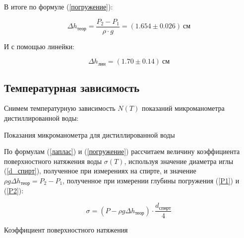 \documentclass[a4paper,12pt]{article} %
\begin{document}
В итоге по формуле (\ref{погружение}):

\begin{equation}\label{h_теор}
	\Delta h_{теор} = \dfrac{P_2 - P_1}{\rho \cdot g} = (1.654 \pm 0.026) \ см
\end{equation}

И с помощью линейки:

\begin{equation}\label{h_лин}
	\Delta h_{лин} = (1.70 \pm 0.14) \ см
\end{equation}

\subsection*{Температурная зависимость}

Снимем температурную зависимость $N(T)$ показаний микроманометра дистиллированной воды:

\begin{table}[ht!]
	\centering
	
	\caption{Показания микроманометра для дистиллированной воды}
\end{table}

По формулам (\ref{лаплас}) и (\ref{погружение}) рассчитаем величину коэффициента поверхностного натяжения воды $\sigma(T)$, используя значение диаметра иглы (\ref{d_спирт}), полученное при измерениях на спирте, и значение $\rho g \Delta h_{теор} = P_2 - P_1$, полученное при измерении глубины погружения (\ref{P1}) и (\ref{P2}):

$$\sigma = (P - \rho g \Delta h_{теор}) \cdot \dfrac{d_{спирт}}{4} $$

\begin{table}[ht!]
	\centering
	
	\caption{Коэффициент поверхностного натяжения}
\end{table}

\newpage

\end{document}
